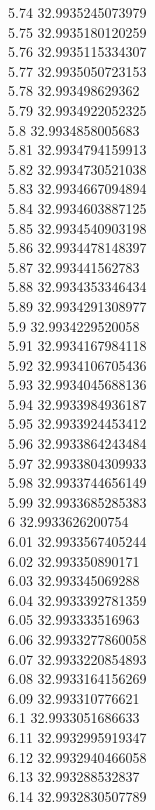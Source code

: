 {5.74	32.9935245073979\\
5.75	32.9935180120259\\
5.76	32.9935115334307\\
5.77	32.9935050723153\\
5.78	32.993498629362\\
5.79	32.9934922052325\\
5.8	32.9934858005683\\
5.81	32.9934794159913\\
5.82	32.9934730521038\\
5.83	32.9934667094894\\
5.84	32.9934603887125\\
5.85	32.9934540903198\\
5.86	32.9934478148397\\
5.87	32.993441562783\\
5.88	32.9934353346434\\
5.89	32.9934291308977\\
5.9	32.9934229520058\\
5.91	32.9934167984118\\
5.92	32.9934106705436\\
5.93	32.9934045688136\\
5.94	32.9933984936187\\
5.95	32.9933924453412\\
5.96	32.9933864243484\\
5.97	32.9933804309933\\
5.98	32.9933744656149\\
5.99	32.9933685285383\\
6	32.9933626200754\\
6.01	32.9933567405244\\
6.02	32.993350890171\\
6.03	32.993345069288\\
6.04	32.9933392781359\\
6.05	32.993333516963\\
6.06	32.9933277860058\\
6.07	32.9933220854893\\
6.08	32.9933164156269\\
6.09	32.993310776621\\
6.1	32.9933051686633\\
6.11	32.9932995919347\\
6.12	32.9932940466058\\
6.13	32.993288532837\\
6.14	32.9932830507789\\
}
